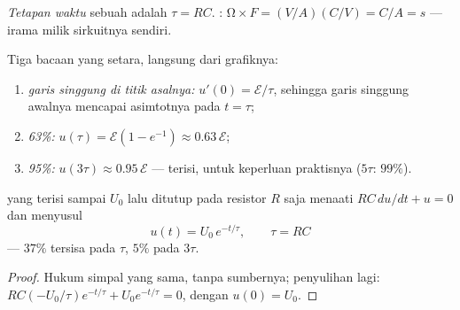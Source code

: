 \begin{definition}\label{def:g12:rc-rl-circuits:tau}
\emph{Tetapan waktu} sebuah  adalah
$\tau = RC$. : $\unit{\ohm} \times \unit{F} =
(\unit{V/A})(\unit{C/V}) = \unit{C/A} = \unit{s}$ --- irama milik
sirkuitnya sendiri.
\end{definition}

\begin{method}\label{met:g12:rc-rl-circuits:reading}
Tiga bacaan yang setara, langsung dari grafiknya:
\begin{enumerate}
  \item \emph{garis singgung di titik asalnya:} $u'(0) = \mathcal{E}/\tau$, sehingga
        garis singgung awalnya mencapai asimtotnya pada $t = \tau$;
  \item \emph{63\%:} $u(\tau) = \mathcal{E}(1 - e^{-1}) \approx
        0.63\,\mathcal{E}$;
  \item \emph{95\%:} $u(3\tau) \approx 0.95\,\mathcal{E}$ --- terisi,
        untuk keperluan praktisnya ($5\tau$: $99\%$).
\end{enumerate}
\end{method}

\begin{proposition}[Pengosongan]\label{prop:g12:rc-rl-circuits:discharge}
 yang terisi sampai $U_0$ lalu ditutup pada resistor $R$ saja menaati
$RC\,du/dt + u = 0$ dan menyusul
\[
u(t) = U_0\,e^{-t/\tau}, \qquad \tau = RC
\]
--- $37\%$ tersisa pada $\tau$, $5\%$ pada $3\tau$.
\end{proposition}

\begin{proof}
Hukum simpal yang sama, tanpa sumbernya; penyulihan lagi:
$RC(-U_0/\tau)e^{-t/\tau} + U_0 e^{-t/\tau} = 0$, dengan $u(0) = U_0$.
\end{proof}

